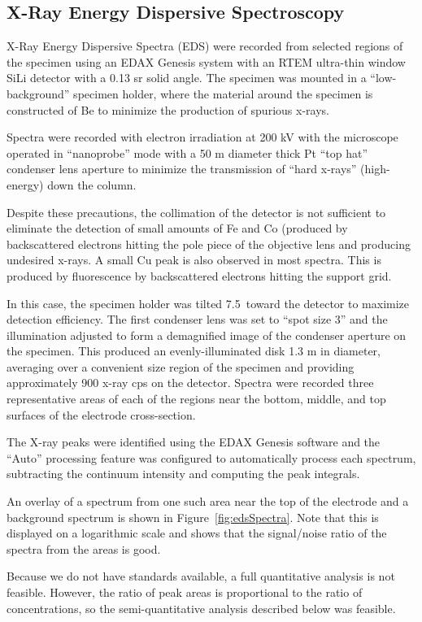 \subsection{X-Ray Energy Dispersive Spectroscopy}

X-Ray Energy Dispersive Spectra (EDS) were recorded from selected
regions of the specimen using an EDAX Genesis system with an RTEM
ultra-thin window SiLi detector with a 0.13 sr solid angle. The
specimen was mounted in a ``low-background'' specimen holder,
where the material around the specimen is constructed of Be to
minimize the production of spurious x-rays.

Spectra were recorded with electron irradiation at 200 kV with the
microscope operated in ``nanoprobe'' mode with a 50 \textmu m diameter
thick Pt ``top hat'' condenser lens aperture to minimize the
transmission of ``hard x-rays'' (high-energy) down the column.

Despite these precautions, the collimation of the detector
is not sufficient to eliminate the detection of small amounts
of Fe and Co (produced by backscattered electrons hitting the
pole piece of the objective lens and producing undesired x-rays.
A small Cu peak is also observed in most spectra. This is produced
by fluorescence by backscattered electrons hitting the support grid.

In this case, the specimen holder was tilted 7.5\degree\ toward
the detector to maximize detection efficiency. The first condenser
lens was set to ``spot size 3'' and the illumination adjusted to
form a demagnified image of the condenser aperture on the specimen.
This produced an evenly-illuminated disk 1.3 \textmu m in diameter,
averaging over a convenient size region of the specimen and providing
approximately 900 x-ray cps on the detector. Spectra were recorded 
three representative areas of each of the regions near the bottom,
middle, and top surfaces of the electrode cross-section.

The X-ray peaks were identified using the EDAX Genesis software
and the ``Auto'' processing feature was configured to automatically
process each spectrum, subtracting the continuum intensity and
computing the peak integrals.

An overlay of a spectrum from one such area near the
top of the electrode and a background spectrum is shown
in Figure~\ref{fig:edsSpectra}. Note that this is displayed on
a logarithmic scale and shows that the signal/noise ratio of the
spectra from the areas is good.

Because we do not have standards available, a full quantitative
analysis is not feasible. However, the ratio of peak areas is
proportional to the ratio of concentrations, so the semi-quantitative
analysis described below was feasible.


